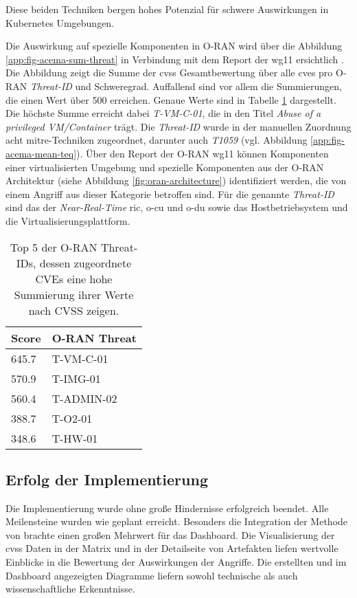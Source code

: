 Diese beiden Techniken bergen hohes Potenzial für schwere Auswirkungen in Kubernetes Umgebungen.
\par Die Auswirkung auf spezielle Komponenten in O-RAN wird über die Abbildung \ref{app:fig-acema-sum-threat} in Verbindung mit dem Report der \gls{wg11} ersichtlich \autocite{o-ranworkgroup11securityworkgroupORANSecurityThreat2024}. Die Abbildung zeigt die Summe der \gls{cvss} Gesamtbewertung über alle \glspl{cve} pro O-RAN \textit{Threat-ID} und Schweregrad. Auffallend sind vor allem die Summierungen, die einen Wert über 500 erreichen. Genaue Werte sind in Tabelle \ref{tab:top5-threats} dargestellt. Die höchste Summe erreicht dabei \textit{T-VM-C-01}, die in \autocite{o-ranworkgroup11securityworkgroupORANSecurityThreat2024} den Titel \textit{Abuse of a privileged VM/Container} trägt. Die \textit{Threat-ID} wurde in der manuellen Zuordnung acht \gls{mitre}-Techniken zugeordnet, darunter auch \textit{T1059} (vgl. Abbildung \ref{app:fig-acema-mean-teq}). Über den Report der O-RAN \gls{wg11} können Komponenten einer virtualisierten Umgebung und spezielle Komponenten aus der O-RAN Architektur (siehe Abbildung \ref{fig:oran-architecture}) identifiziert werden, die von einem Angriff aus dieser Kategorie betroffen sind. Für die genannte \textit{Threat-ID} sind das der \textit{Near-Real-Time} \gls{ric}, \gls{o-cu} und \gls{o-du} sowie das Hostbetriebsystem und die Virtualisierungsplattform.

\begin{table}[h]
    \centering
    \caption{Top 5 der O-RAN Threat-IDs, dessen zugeordnete CVEs eine hohe Summierung ihrer Werte nach CVSS zeigen.}
    \begin{tabular}{|l|l|}
        \hline
        Score & O-RAN Threat \\ \hline
        645.7 & T-VM-C-01    \\ \hline
        570.9 & T-IMG-01     \\ \hline
        560.4 & T-ADMIN-02   \\ \hline
        388.7 & T-O2-01      \\ \hline
        348.6 & T-HW-01      \\ \hline
    \end{tabular}
    \label{tab:top5-threats}
\end{table}

\subsection{Erfolg der Implementierung}
Die Implementierung wurde ohne große Hindernisse erfolgreich beendet. Alle Meilensteine wurden wie geplant erreicht. Besonders die Integration der Methode von \citeauthor{klementSecuring6GTransition2024} brachte einen großen Mehrwert für das Dashboard. Die Visualisierung der \gls{cvss} Daten in der Matrix und in der Detailseite von Artefakten liefen wertvolle Einblicke in die Bewertung der Auswirkungen der Angriffe. Die erstellten und im Dashboard angezeigten Diagramme liefern sowohl technische als auch wissenschaftliche Erkenntnisse.

